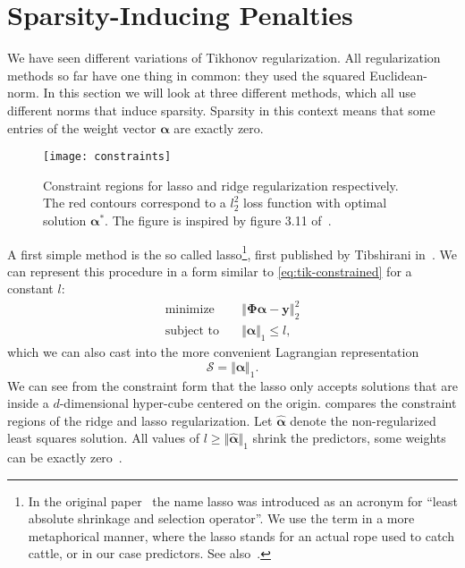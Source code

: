 \section{Sparsity-Inducing Penalties}\label{sec:sparse-penalties}
We have seen different variations of Tikhonov regularization.
All regularization methods so far have one thing in common: they used the squared Euclidean-norm.
In this section we will look at three different methods, which all use different norms that induce sparsity.
Sparsity in this context means that some entries of the weight vector \(\bm{\alpha}\) are exactly zero.

\begin{figure}[tb]
    \centering
    \texttt{[image: constraints]}
    \caption{Constraint regions for lasso and ridge regularization respectively. The red contours correspond
      to a \(l_2^2\) loss function with optimal solution \(\bm{\alpha}^*\). The
      figure is inspired by figure 3.11 of~\cite{esl}.}\label{fig:reg-constraints}
\end{figure}

A first simple method is the so called lasso\footnote{In the original
  paper~\cite{lasso} the name lasso  was introduced as an
  acronym for ``least absolute shrinkage and selection operator''.
We use the term in a more metaphorical manner, where the lasso stands for an
actual rope used to catch cattle, or in our case predictors. See also~\cite{sparse-learning}.},
first published by Tibshirani in~\cite{lasso}.
We can represent this procedure in a form similar to \cref{eq:tik-constrained} for a constant \(l\):
\begin{align*}\label{eq:lasso-constrained}
\text{minimize} \quad &
 \left\Vert  \bm{\Phi} \bm{\alpha} - \bm{y}  \right\Vert_2^2 \\
\text{subject to} \quad & \Vert \bm{\alpha}  \Vert_1 \leq l,
\end{align*}
which we can also cast into the more convenient Lagrangian representation
\begin{equation*}
\mathcal{S} = \Vert \bm{\alpha} \Vert_1.
\end{equation*}
We can see from the constraint form that the lasso only accepts solutions that
are inside a \(d\)-dimensional hyper-cube centered on the origin.
 compares the constraint regions of the ridge and
lasso regularization.
Let \(\hat{\bm{\alpha}}\) denote the non-regularized least squares solution.
All values of \(l \geq \Vert \hat{\bm{\alpha}} \Vert_1\) shrink the predictors,
some weights can be exactly zero~\cite{lasso}.

